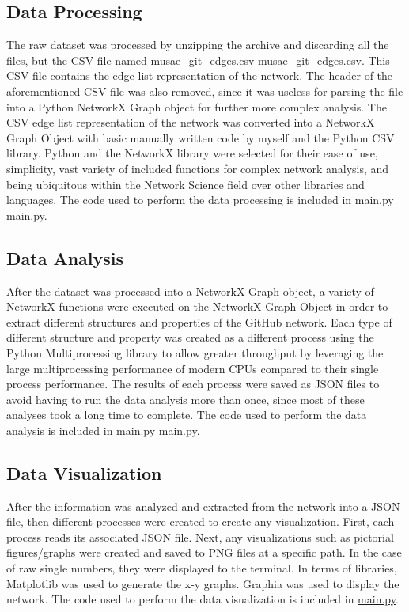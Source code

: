 \documentclass[9pt,twocolumn,twoside]{pnas-new}
\begin{document}
{\subsection{Data Processing} The raw dataset was processed by unzipping the archive and discarding all the files, but the CSV file named musae\_git\_edges.csv \href{https://github.com/Hockenba/mth450-final-project-report}{musae\_git\_edges.csv}. This CSV file contains the edge list representation of the network. The header of the aforementioned CSV file was also removed, since it was useless for parsing the file into a Python NetworkX Graph object for further more complex analysis. The CSV edge list representation of the network was converted into a NetworkX Graph Object with basic manually written code by myself and the Python CSV library. Python and the NetworkX library were selected for their ease of use, simplicity, vast variety of included functions for complex network analysis, and being ubiquitous within the Network Science field over other libraries and languages. The code used to perform the data processing is included in main.py \href{https://github.com/Hockenba/mth450-final-project-report}{main.py}.

\subsection{Data Analysis} After the dataset was processed into a NetworkX Graph object, a variety of NetworkX functions were executed on the NetworkX Graph Object in order to extract different structures and properties of the GitHub network. Each type of different structure and property was created as a different process using the Python Multiprocessing library to allow greater throughput by leveraging the large multiprocessing performance of modern CPUs compared to their single process performance. The results of each process were saved as JSON files to avoid having to run the data analysis more than once, since most of these analyses took a long time to complete. The code used to perform the data analysis is included in main.py \href{https://github.com/Hockenba/mth450-final-project-report}{main.py}.

\subsection{Data Visualization} After the information was analyzed and extracted from the network into a JSON file, then different processes were created to create any visualization. First, each process reads its associated JSON file. Next, any visualizations such as pictorial figures/graphs were created and saved to PNG files at a specific path. In the case of raw single numbers, they were displayed to the terminal. In terms of libraries, Matplotlib was used to generate the x-y graphs. Graphia was used to display the network. The code used to perform the data visualization is included in \href{https://github.com/Hockenba/mth450-final-project-report}{main.py}.
}
\end{document}
